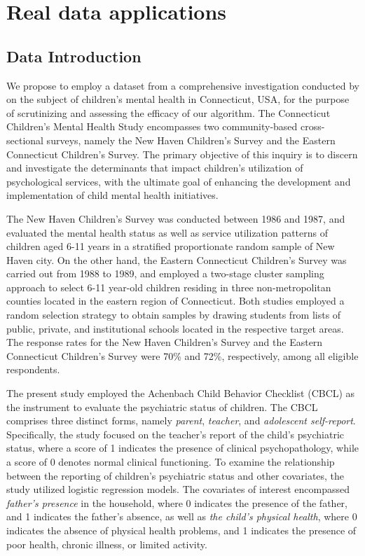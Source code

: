 \documentclass[11pt]{article}
\begin{document}
\section{Real data applications}
\label{sec:data}

\subsection{Data Introduction}

We propose to employ a dataset from a comprehensive investigation conducted by \cite{Gwendolyn1997mentalhealth} on the subject of children's mental health in Connecticut, USA, for the purpose of scrutinizing and assessing the efficacy of our algorithm. The Connecticut Children's Mental Health Study encompasses two community-based cross-sectional surveys, namely the New Haven Children's Survey and the Eastern Connecticut Children's Survey. The primary objective of this inquiry is to discern and investigate the determinants that impact children's utilization of psychological services, with the ultimate goal of enhancing the development and implementation of child mental health initiatives.

The New Haven Children's Survey was conducted between 1986 and 1987, and evaluated the mental health status as well as service utilization patterns of children aged 6-11 years in a stratified proportionate random sample of New Haven city. On the other hand, the Eastern Connecticut Children's Survey was carried out from 1988 to 1989, and employed a two-stage cluster sampling approach to select 6-11 year-old children residing in three non-metropolitan counties located in the eastern region of Connecticut. Both studies employed a random selection strategy to obtain samples by drawing students from lists of public, private, and institutional schools located in the respective target areas. The response rates for the New Haven Children's Survey and the Eastern Connecticut Children's Survey were 70\% and 72\%, respectively, among all eligible respondents.

The present study employed the Achenbach Child Behavior Checklist (CBCL) as the instrument to evaluate the psychiatric status of children. The CBCL comprises three distinct forms, namely \textit{parent}, \textit{teacher}, and \textit{adolescent self-report}. Specifically, the study focused on the teacher's report of the child's psychiatric status, where a score of 1 indicates the presence of clinical psychopathology, while a score of 0 denotes normal clinical functioning. To examine the relationship between the reporting of children's psychiatric status and other covariates, the study utilized logistic regression models. The covariates of interest encompassed \textit{father's presence} in the household, where 0 indicates the presence of the father, and 1 indicates the father's absence, as well as \textit{the child's physical health}, where 0 indicates the absence of physical health problems, and 1 indicates the presence of poor health, chronic illness, or limited activity.
\end{document}
